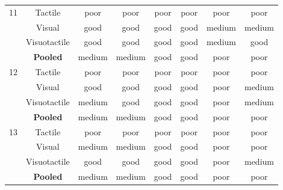 \begin{longtable}{lccccccc}
11 & Tactile & \cellcolor{red!15}poor & \cellcolor{red!15}poor & \cellcolor{red!15}poor & \cellcolor{red!15}poor & \cellcolor{red!15}poor & \cellcolor{red!15}poor \\
 & Visual & \cellcolor{green!15}good & \cellcolor{green!15}good & \cellcolor{green!15}good & \cellcolor{green!15}good & \cellcolor{yellow!25}medium & \cellcolor{yellow!25}medium \\
 & Visuotactile & \cellcolor{green!15}good & \cellcolor{green!15}good & \cellcolor{green!15}good & \cellcolor{green!15}good & \cellcolor{yellow!25}medium & \cellcolor{green!15}good \\
\textbf{} & \textbf{Pooled} & \cellcolor{yellow!25}medium & \cellcolor{yellow!25}medium & \cellcolor{green!15}good & \cellcolor{green!15}good & \cellcolor{red!15}poor & \cellcolor{red!15}poor \\
12 & Tactile & \cellcolor{red!15}poor & \cellcolor{red!15}poor & \cellcolor{red!15}poor & \cellcolor{red!15}poor & \cellcolor{red!15}poor & \cellcolor{red!15}poor \\
 & Visual & \cellcolor{green!15}good & \cellcolor{green!15}good & \cellcolor{green!15}good & \cellcolor{green!15}good & \cellcolor{red!15}poor & \cellcolor{yellow!25}medium \\
 & Visuotactile & \cellcolor{yellow!25}medium & \cellcolor{green!15}good & \cellcolor{green!15}good & \cellcolor{green!15}good & \cellcolor{red!15}poor & \cellcolor{yellow!25}medium \\
\textbf{} & \textbf{Pooled} & \cellcolor{yellow!25}medium & \cellcolor{yellow!25}medium & \cellcolor{green!15}good & \cellcolor{green!15}good & \cellcolor{red!15}poor & \cellcolor{red!15}poor \\
13 & Tactile & \cellcolor{red!15}poor & \cellcolor{red!15}poor & \cellcolor{red!15}poor & \cellcolor{red!15}poor & \cellcolor{red!15}poor & \cellcolor{red!15}poor \\
 & Visual & \cellcolor{yellow!25}medium & \cellcolor{yellow!25}medium & \cellcolor{green!15}good & \cellcolor{green!15}good & \cellcolor{red!15}poor & \cellcolor{red!15}poor \\
 & Visuotactile & \cellcolor{green!15}good & \cellcolor{green!15}good & \cellcolor{green!15}good & \cellcolor{green!15}good & \cellcolor{red!15}poor & \cellcolor{yellow!25}medium \\
\textbf{} & \textbf{Pooled} & \cellcolor{yellow!25}medium & \cellcolor{yellow!25}medium & \cellcolor{green!15}good & \cellcolor{green!15}good & \cellcolor{red!15}poor & \cellcolor{red!15}poor \\

\end{longtable}
